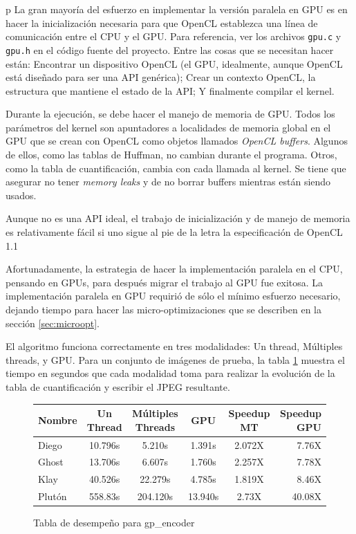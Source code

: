 {p
La gran mayoría del esfuerzo en implementar la versión paralela en GPU es en
hacer la inicialización necesaria para que OpenCL establezca una línea de
comunicación entre el CPU y el GPU. Para referencia, ver los archivos
\verb+gpu.c+ y \verb+gpu.h+ en el código fuente del proyecto. Entre las cosas
que se necesitan hacer están: Encontrar un dispositivo OpenCL (el GPU,
idealmente, aunque OpenCL está diseñado para ser una API genérica); Crear un
contexto OpenCL, la estructura que mantiene el estado de la API; Y finalmente
compilar el kernel.

Durante la ejecución, se debe hacer el manejo de memoria de GPU. Todos los
parámetros del kernel son apuntadores a localidades de memoria global en el GPU
que se crean con OpenCL como objetos llamados \emph{OpenCL buffers}. Algunos de
ellos, como las tablas de Huffman, no cambian durante el programa. Otros, como
la tabla de cuantificación, cambia con cada llamada al kernel. Se tiene que
asegurar no tener \emph{memory leaks} y de no borrar buffers mientras están
siendo usados.

Aunque no es una API ideal, el trabajo de inicialización y de manejo de memoria
es relativamente fácil si uno sigue al pie de la letra la especificación de
OpenCL 1.1 \cite{opencl-spec}

Afortunadamente, la estrategia de hacer la implementación paralela en el CPU,
pensando en GPUs, para después migrar el trabajo al GPU fue exitosa. La
implementación paralela en GPU requirió de sólo el mínimo esfuerzo necesario,
dejando tiempo para hacer las micro-optimizaciones que se describen en la
sección \ref{sec:microopt}.

El algoritmo funciona correctamente en tres modalidades: Un thread, Múltiples
threads, y GPU. Para un conjunto de imágenes de prueba, la tabla
\ref{fig:perf_table_orig} muestra el tiempo en segundos que cada modalidad toma
para realizar la evolución de la tabla de cuantificación y escribir el JPEG
resultante.

\begin{figure}[h]
    \begin{tabular}{ |l c c c c r| }
        \hline
        Nombre &  Un Thread & Múltiples Threads & GPU & Speedup MT & Speedup GPU \\
        \hline
        Diego & 10.796s & 5.210s & 1.391s  & 2.072X & 7.76X \\
        Ghost & 13.706s & 6.607s & 1.760s  & 2.257X & 7.78X \\
        Klay & 40.526s & 22.279s & 4.785s  & 1.819X & 8.46X \\%
        Plutón & 558.83s & 204.120s & 13.940s & 2.73X & 40.08X \\ %
        \hline
    \end{tabular}
    \caption{Tabla de desempeño para gp\_encoder}
    \label{fig:perf_table_orig}
\end{figure}

}
